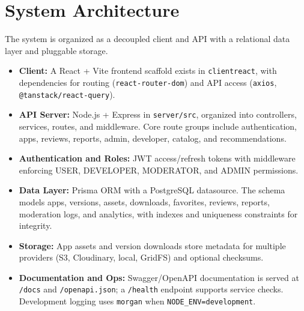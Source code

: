 \documentclass[12pt,a4paper]{article}
\begin{document}
\section{System Architecture}
The system is organized as a decoupled client and API with a relational data layer and pluggable storage.
\begin{itemize}
    \item \textbf{Client:} A React + Vite frontend scaffold exists in \texttt{clientreact}, with dependencies for routing (\texttt{react-router-dom}) and API access (\texttt{axios}, \texttt{@tanstack/react-query}).
    \item \textbf{API Server:} Node.js + Express in \texttt{server/src}, organized into controllers, services, routes, and middleware. Core route groups include authentication, apps, reviews, reports, admin, developer, catalog, and recommendations.
    \item \textbf{Authentication and Roles:} JWT access/refresh tokens with middleware enforcing USER, DEVELOPER, MODERATOR, and ADMIN permissions.
    \item \textbf{Data Layer:} Prisma ORM with a PostgreSQL datasource. The schema models apps, versions, assets, downloads, favorites, reviews, reports, moderation logs, and analytics, with indexes and uniqueness constraints for integrity.
    \item \textbf{Storage:} App assets and version downloads store metadata for multiple providers (S3, Cloudinary, local, GridFS) and optional checksums.
    \item \textbf{Documentation and Ops:} Swagger/OpenAPI documentation is served at \texttt{/docs} and \texttt{/openapi.json}; a \texttt{/health} endpoint supports service checks. Development logging uses \texttt{morgan} when \texttt{NODE\_ENV=development}.
\end{itemize}
\end{document}
